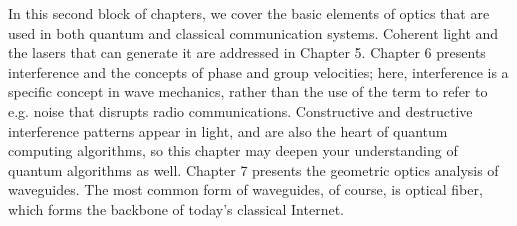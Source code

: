 
\begin{partintro}

In this second block of chapters, we cover the basic elements of optics that are used in both quantum and classical communication systems. Coherent light and the lasers that can generate it are addressed in Chapter 5. Chapter 6 presents interference and the concepts of phase and group velocities; here, interference is a specific concept in wave mechanics, rather than the use of the term to refer to e.g. noise that disrupts radio communications. Constructive and destructive interference patterns appear in light, and are also the heart of quantum computing algorithms, so this chapter may deepen your understanding of quantum algorithms as well.  Chapter 7 presents the geometric optics analysis of waveguides.  The most common form of waveguides, of course, is optical fiber, which forms the backbone of today's classical Internet.
\end{partintro}
